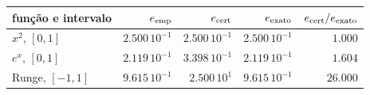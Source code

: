 \begin{tabular}{lrrrr}
\toprule
função e intervalo & $e_{\rm emp}$ & $e_{\rm cert}$ & $e_{\rm exato}$ & $e_{\rm cert}/e_{\rm exato}$\\
\midrule
$x^2$, $[0,1]$ & $2.500\,10^{-1}$ & $2.500\,10^{-1}$ & $2.500\,10^{-1}$ & $1.000$\\
$e^x$, $[0,1]$ & $2.119\,10^{-1}$ & $3.398\,10^{-1}$ & $2.119\,10^{-1}$ & $1.604$\\
Runge, $[-1,1]$ & $9.615\,10^{-1}$ & $2.500\,10^{1}$ & $9.615\,10^{-1}$ & $26.000$\\
\bottomrule
\end{tabular}

